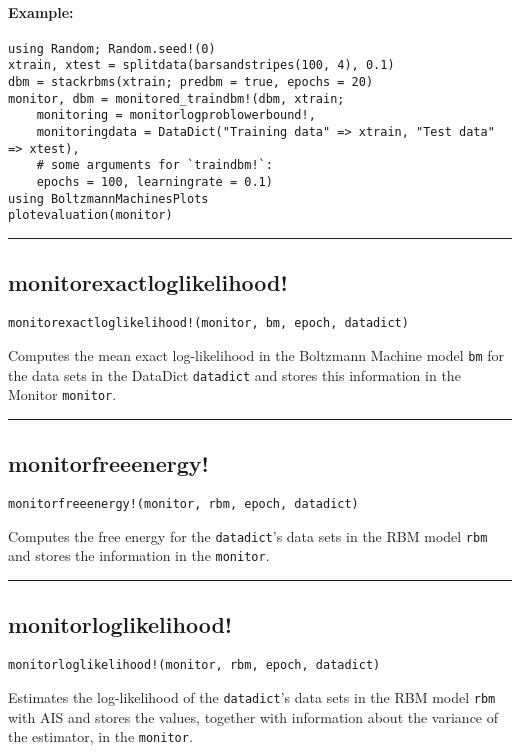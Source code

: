 \paragraph*{Example:}
\begin{verbatim}
using Random; Random.seed!(0)
xtrain, xtest = splitdata(barsandstripes(100, 4), 0.1)
dbm = stackrbms(xtrain; predbm = true, epochs = 20)
monitor, dbm = monitored_traindbm!(dbm, xtrain;
    monitoring = monitorlogproblowerbound!,
    monitoringdata = DataDict("Training data" => xtrain, "Test data" => xtest),
    # some arguments for `traindbm!`:
    epochs = 100, learningrate = 0.1)
using BoltzmannMachinesPlots
plotevaluation(monitor)
\end{verbatim}
\noindent\rule{\textwidth}{1pt}
\subsection*{monitorexactloglikelihood!}  \label{bms_monitorexactloglikelihood!}
\begin{verbatim}
monitorexactloglikelihood!(monitor, bm, epoch, datadict)
\end{verbatim}
Computes the mean exact log-likelihood in the Boltzmann Machine model \texttt{bm} for the data sets in the DataDict \texttt{datadict} and stores this information in the Monitor \texttt{monitor}.

\noindent\rule{\textwidth}{1pt}
\subsection*{monitorfreeenergy!}  \label{bms_monitorfreeenergy!}
\begin{verbatim}
monitorfreeenergy!(monitor, rbm, epoch, datadict)
\end{verbatim}
Computes the free energy for the \texttt{datadict}'s data sets in the RBM model \texttt{rbm} and stores the information in the \texttt{monitor}.

\noindent\rule{\textwidth}{1pt}
\subsection*{monitorloglikelihood!}  \label{bms_monitorloglikelihood!}
\begin{verbatim}
monitorloglikelihood!(monitor, rbm, epoch, datadict)
\end{verbatim}
Estimates the log-likelihood of the \texttt{datadict}'s data sets in the RBM model \texttt{rbm} with AIS and stores the values, together with information about the variance of the estimator, in the \texttt{monitor}.

